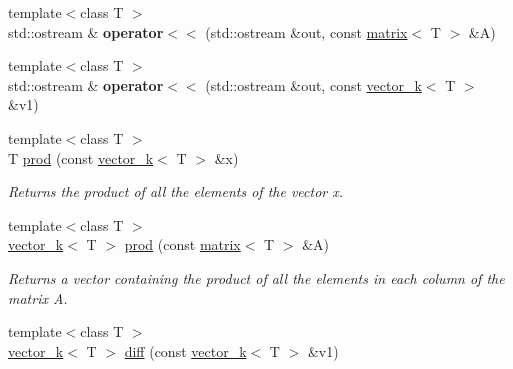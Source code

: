 \begin{DoxyCompactItemize}
\item 
\hypertarget{namespacekeycpp_a55e8bada51586c0561e1b32ca1ab5f2a}{{\footnotesize template$<$class T $>$ }\\std\-::ostream \& {\bfseries operator$<$$<$} (std\-::ostream \&out, const \hyperlink{classkeycpp_1_1matrix}{matrix}$<$ T $>$ \&A)}\label{namespacekeycpp_a55e8bada51586c0561e1b32ca1ab5f2a}

\item 
\hypertarget{namespacekeycpp_a86f8946c126102b4467b70da16766b7a}{{\footnotesize template$<$class T $>$ }\\std\-::ostream \& {\bfseries operator$<$$<$} (std\-::ostream \&out, const \hyperlink{classkeycpp_1_1vector__k}{vector\-\_\-k}$<$ T $>$ \&v1)}\label{namespacekeycpp_a86f8946c126102b4467b70da16766b7a}

\item 
\hypertarget{namespacekeycpp_add55ad2a40111d6368744a3d4144f25a}{{\footnotesize template$<$class T $>$ }\\T \hyperlink{namespacekeycpp_add55ad2a40111d6368744a3d4144f25a}{prod} (const \hyperlink{classkeycpp_1_1vector__k}{vector\-\_\-k}$<$ T $>$ \&x)}\label{namespacekeycpp_add55ad2a40111d6368744a3d4144f25a}

\begin{DoxyCompactList}\small\item\em Returns the product of all the elements of the vector x. \end{DoxyCompactList}\item 
\hypertarget{namespacekeycpp_af5471fc9074471701bde9e68eb7971b4}{{\footnotesize template$<$class T $>$ }\\\hyperlink{classkeycpp_1_1vector__k}{vector\-\_\-k}$<$ T $>$ \hyperlink{namespacekeycpp_af5471fc9074471701bde9e68eb7971b4}{prod} (const \hyperlink{classkeycpp_1_1matrix}{matrix}$<$ T $>$ \&A)}\label{namespacekeycpp_af5471fc9074471701bde9e68eb7971b4}

\begin{DoxyCompactList}\small\item\em Returns a vector containing the product of all the elements in each column of the matrix A. \end{DoxyCompactList}\item 
\hypertarget{namespacekeycpp_a52c37ec9c41349fd6bd862b8ebdd01bb}{{\footnotesize template$<$class T $>$ }\\\hyperlink{classkeycpp_1_1vector__k}{vector\-\_\-k}$<$ T $>$ \hyperlink{namespacekeycpp_a52c37ec9c41349fd6bd862b8ebdd01bb}{diff} (const \hyperlink{classkeycpp_1_1vector__k}{vector\-\_\-k}$<$ T $>$ \&v1)}\label{namespacekeycpp_a52c37ec9c41349fd6bd862b8ebdd01bb}


\end{DoxyCompactItemize}
